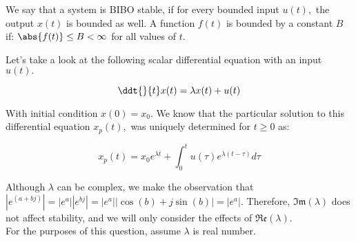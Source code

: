 

We say that a system is BIBO stable, if for every bounded input $u(t),$ the output $x(t)$ is bounded as well. \vskip 1pt
A function $f(t)$ is bounded by a constant $B$ if: $\abs{f(t)} \leq B < \infty$ for all values of $t.$

Let's take a look at the following scalar differential equation with an input $u(t).$

\begin{equation} \label{eq:h}
\ddt{}{t} x(t) = \lambda x(t) + u(t)
\end{equation}

With initial condition $x(0) = x_{0}.$ 
We know that the particular solution to this differential equation $x_{p}(t),$ was uniquely determined for $t \geq 0$ as:

\begin{equation} \label{eq:h}
x_{p}(t) = x_{0} e^{\lambda t} + \int_{0}^{t} u(\tau) e^{\lambda(t - \tau)} d\tau
\end{equation}

Although $\lambda$ can be complex, we make the observation that $|e^{(a + bj)}| = |e^{a}| |e^{bj}| = |e^{a}| |\cos(b) + j \sin(b)| = |e^{a}|.$
Therefore, $\mathfrak{Im}(\lambda)$ does not affect stability, and we will only consider the effects of $\mathfrak{Re}(\lambda).$  \\
For the purposes of this question, assume $\lambda$ is real number. 


